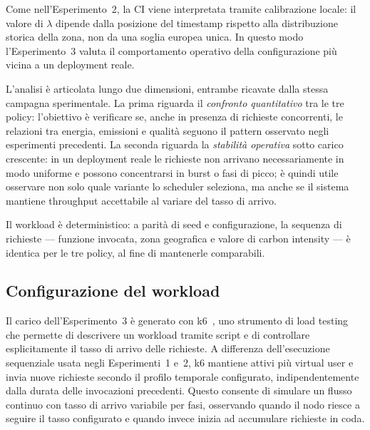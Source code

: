 Come nell'Esperimento~2, la CI viene interpretata tramite calibrazione
locale: il valore di $\lambda$ dipende dalla posizione del timestamp
rispetto alla distribuzione storica della zona, non da una soglia europea
unica. In questo modo l'Esperimento~3 valuta il comportamento operativo
della configurazione più vicina a un deployment reale.

L'analisi è articolata lungo due dimensioni, entrambe ricavate dalla
stessa campagna sperimentale. La prima riguarda il \emph{confronto quantitativo}
tra le tre policy: l'obiettivo è verificare se, anche in presenza di
richieste concorrenti, le relazioni tra energia, emissioni e qualità
seguono il pattern osservato negli esperimenti precedenti. La seconda
riguarda la \emph{stabilità operativa} sotto carico crescente: in un
deployment reale le richieste non arrivano necessariamente in modo
uniforme e possono concentrarsi in burst o fasi di picco; è quindi utile
osservare non solo quale variante lo scheduler seleziona, ma anche se il
sistema mantiene throughput accettabile al variare del tasso di arrivo.

Il workload è deterministico: a parità di seed e configurazione, la
sequenza di richieste --- funzione invocata, zona geografica e valore di
carbon intensity --- è identica per le tre policy, al fine di mantenerle
comparabili.

\subsection{Configurazione del workload}
\label{subsec:esperimento3-config}

Il carico dell'Esperimento~3 è generato con k6~\cite{grafana-k6-docs},
uno strumento di load testing che permette di descrivere un workload tramite script e di
controllare esplicitamente il tasso di arrivo delle richieste. A
differenza dell'esecuzione sequenziale usata negli Esperimenti~1 e~2, k6
mantiene attivi più virtual user e invia nuove richieste secondo il
profilo temporale configurato, indipendentemente dalla durata delle
invocazioni precedenti. Questo consente di simulare un flusso continuo con tasso di arrivo
variabile per fasi, osservando quando il nodo riesce a seguire
il tasso configurato e quando invece inizia ad accumulare richieste in coda.

